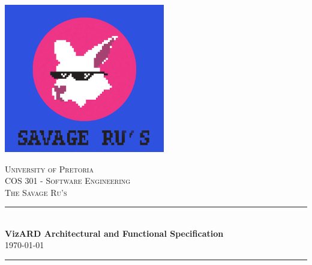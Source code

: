 \documentclass[a4paper,12pt]{article}
\begin{document}
\begin{titlepage}

\newcommand{\HRule}{\rule{\linewidth}{0.5mm}} %

\center %
 
\begin{center}
	\includegraphics[width=7cm]{../Images/SavageRus.png}
\end{center}	
\vfill
\textsc{\LARGE University of Pretoria}\\[1.5cm]
\textsc{\Large COS 301 - Software Engineering}\\[0.5cm]
\textsc{\large The Savage Ru's}\\[0.5cm]


\HRule \\[0.4cm]
{ \huge \bfseries VizARD Architectural and Functional Specification}\\[0.4cm] %
{\large \today}
\HRule \\[1.5cm]
 


\end{titlepage}
\end{document}
